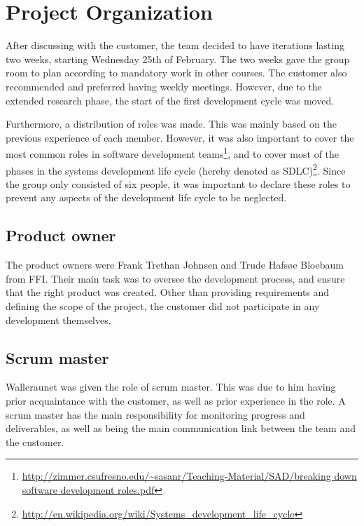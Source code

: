 \section{Project Organization}
\label{sec:process_and_methodology-project_organization}

After discussing with the customer, the team decided to have iterations lasting two weeks, starting Wednesday 25th of February. The two weeks gave the group room to plan according to mandatory work in other courses. The customer also recommended and preferred having weekly meetings. However, due to the extended research phase, the start of the first development cycle was moved.

Furthermore, a distribution of roles was made. This was mainly based on the previous experience of each member. However, it was also important to cover the most common roles in software development teams\footnote{\url{http://zimmer.csufresno.edu/~sasanr/Teaching-Material/SAD/breaking down software development roles.pdf}}, and to cover most of the phases in the systems development life cycle (hereby denoted as SDLC)\footnote{\url{http://en.wikipedia.org/wiki/Systems_development_life_cycle}}. Since the group only consisted of six people, it was important to declare these roles to prevent any aspects of the development life cycle to be neglected.

\subsection{Product owner}
\label{subsec:process_and_methodology-project_organization-product_owner}

The product owners were Frank Trethan Johnsen and Trude Hafsøe Bloebaum from FFI. Their main task was to oversee the development process, and ensure that the right product was created. Other than providing requirements and defining the scope of the project, the customer did not participate in any development themselves.

\subsection{Scrum master}
\label{subsec:process_and_methodology-project_organization-scrum_master}

Walleraunet was given the role of scrum master. This was due to him having prior acquaintance with the customer, as well as prior experience in the role. A scrum master has the main responsibility for monitoring progress and deliverables, as well as being the main communication link between the team and the customer.

